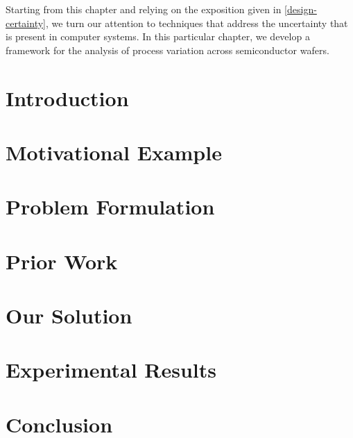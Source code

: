 Starting from this chapter and relying on the exposition given in
\cref{design-certainty}, we turn our attention to techniques that address the
uncertainty that is present in computer systems. In this particular chapter, we
develop a framework for the analysis of process variation across semiconductor
wafers.

\section{Introduction}

\section{Motivational Example}

\section{Problem Formulation}

\section{Prior Work}

\section{Our Solution}

\section{Experimental Results}

\section{Conclusion}
